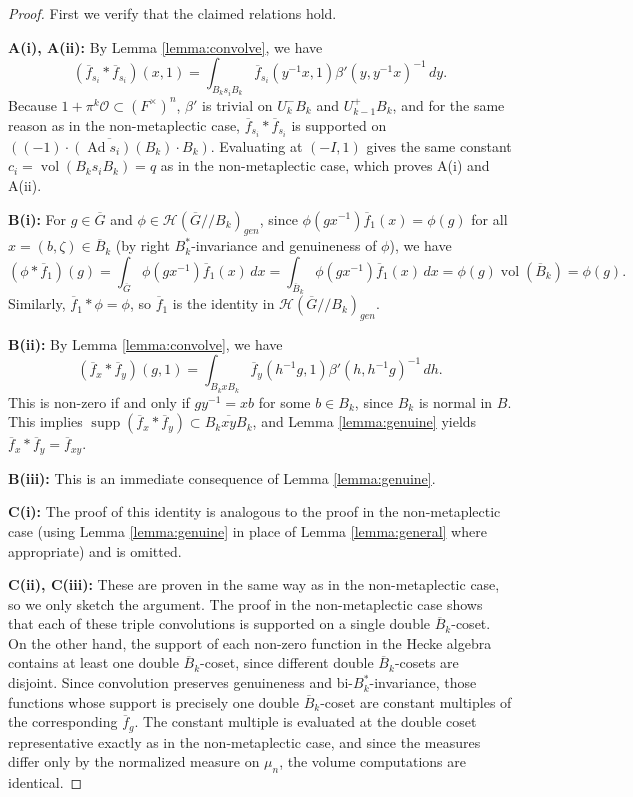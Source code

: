 \documentclass[12pt,letterpaper,reqno]{amsart}
\let\cal\mathcal
\theoremstyle{definition}
\theoremstyle{remark}
\numberwithin{equation}{section}
\begin{document}
\begin{proof}
First we verify that the claimed relations hold.

\textbf{A(i), A(ii):} By Lemma \ref{lemma:convolve}, we have
\[
(\overline{f}_{s_i}*\overline{f}_{s_i})(x,1)
=\int_{B_ks_iB_k}
\overline{f}_{s_i}(y^{-1}x,1)\beta'(y,y^{-1}x)^{-1}\,dy.
\]
Because $1+\pi^k{\cal O}\subset (F^\times)^n$, $\beta'$ is trivial on
$U_k^-B_k$ and $U_{k-1}^+B_k$, and for the same reason as in the
non-metaplectic case, $\overline{f}_{s_i}*\overline{f}_{s_i}$ is supported on
$\overline{((-1)\cdot (\operatorname{Ad} s_i)(B_k)\cdot B_k)}$. Evaluating at
$(-I,1)$ gives the same constant $c_i=\operatorname{vol}(B_ks_iB_k)=q$ as in
the non-metaplectic case, which proves A(i) and A(ii).

\textbf{B(i):} For $g\in \overline{G}$ and $\phi\in {\cal H}(\overline{G}//B_k)_{gen}$,
since $\phi(gx^{-1})\overline{f}_1(x)=\phi(g)$ for all $x=(b,\zeta)\in\overline{B}_k$
(by right $B_k^*$-invariance and genuineness of $\phi$), we have
\[
(\phi*\overline{f}_1)(g)=\int_{\overline{G}}\phi(gx^{-1})\overline{f}_1(x)\,dx
=\int_{\overline{B}_k}\phi(gx^{-1})\overline{f}_1(x)\,dx
=\phi(g)\operatorname{vol}(\overline{B}_k)=\phi(g).
\]
Similarly, $\overline{f}_1*\phi=\phi$, so $\overline{f}_1$ is the identity in
${\cal H}(\overline{G}//B_k)_{gen}$.

\textbf{B(ii):} By Lemma \ref{lemma:convolve}, we have
\[
(\overline{f}_x*\overline{f}_y)(g,1)
=\int_{B_kxB_k}
\overline{f}_{y}(h^{-1}g,1)
\beta'(h,h^{-1}g)^{-1}\,dh.
\]
This is non-zero if and only if $gy^{-1}=xb$ for some $b\in B_k$, since $B_k$
is normal in $B$. This implies
$\operatorname{supp}(\overline{f}_x*\overline{f}_y)\subset
\overline{B_kxyB_k}$, and Lemma \ref{lemma:genuine} yields
$\overline{f}_x*\overline{f}_y=\overline{f}_{xy}$.

\textbf{B(iii):} This is an immediate consequence of Lemma \ref{lemma:genuine}.

\textbf{C(i):} The proof of this identity is analogous to the proof in the
non-metaplectic case (using Lemma \ref{lemma:genuine} in place of Lemma
\ref{lemma:general} where appropriate) and is omitted.

\textbf{C(ii), C(iii):} These are proven in the same way as in the
non-metaplectic case, so we only sketch the argument. The proof in the
non-metaplectic case shows that each of these triple convolutions is supported
on a single double $\overline{B}_k$-coset. On the other hand, the support of
each non-zero function in the Hecke algebra contains at least one double
$\overline{B}_k$-coset, since different double $\overline{B}_k$-cosets are
disjoint. Since convolution preserves genuineness and bi-$B_k^*$-invariance,
those functions whose support is precisely one double $\overline{B}_k$-coset
are constant multiples of the corresponding $\overline{f}_g$. The constant
multiple is evaluated at the double coset representative exactly as in the
non-metaplectic case, and since the measures differ only by the normalized
measure on $\mu_n$, the volume computations are identical.


\end{proof}
\end{document}
